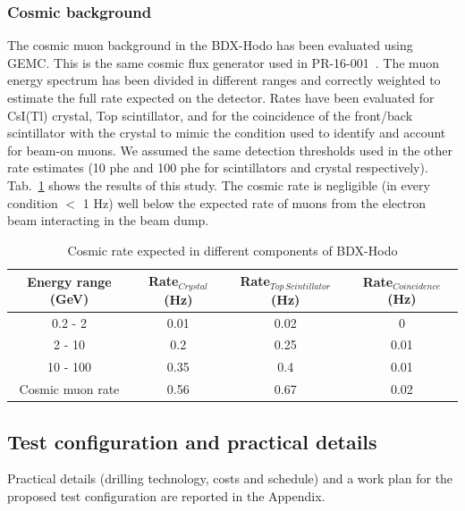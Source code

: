 \subsubsection{Cosmic background}
The cosmic muon background in the BDX-Hodo has been evaluated using GEMC. This is the same cosmic flux generator used in PR-16-001~\cite{bdx-proposal}. The muon energy spectrum has been divided in different ranges  and correctly weighted to estimate the full rate expected on the detector. Rates have been evaluated for CsI(Tl) crystal, Top scintillator,  and for the coincidence of the front/back scintillator with the crystal  to mimic the condition used to identify and account for beam-on muons. We assumed the same detection thresholds used in the other rate estimates (10 phe and 100 phe for scintillators and crystal respectively). Tab.~\ref{tab:cosmic} shows the results of this study. The cosmic rate is negligible (in every condition $<$ 1 Hz) well below the expected rate of muons from the electron beam interacting in the beam dump.

\begin{table}[htp]
\caption{Cosmic rate expected in different components of BDX-Hodo}
\begin{center}
\begin{tabular}{|c|c|c|c|}
\hline
Energy range  (GeV) & Rate$_{Crystal}$  (Hz)&  Rate$_{Top\,Scintillator} $(Hz) & Rate$_{Coincidence}$ (Hz) \\
\hline\hline
 0.2 - 2  & 0.01 &  0.02 & 0\\
 \hline
 2 - 10  & 0.2 &  0.25 & 0.01\\
 \hline
 10 - 100  & 0.35 &  0.4 & 0.01\\
\hline\hline
Cosmic muon rate  & 0.56 &  0.67 & 0.02 \\
\hline\hline
\end{tabular}
\end{center}
\label{tab:cosmic}
\end{table}%

\subsection{Test configuration and practical details}
Practical details (drilling technology, costs and schedule) and a work plan for the proposed test configuration  are reported in the Appendix.

